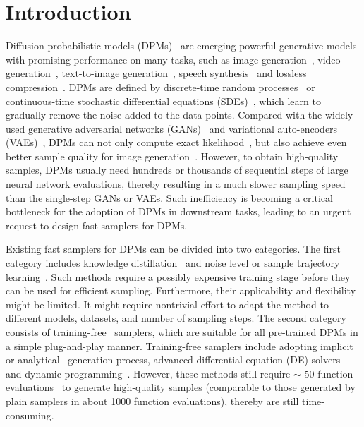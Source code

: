 \section{Introduction}
Diffusion probabilistic models (DPMs)~\citep{sohl2015deep,ho2020denoising,song2020score} are emerging powerful generative models with promising performance on many tasks, such as image generation~\citep{dhariwal2021diffusion,meng2021sdedit}, video generation~\citep{ho2022video}, text-to-image generation~\citep{ramesh2022hierarchical}, speech synthesis~\citep{chen2020wavegrad,chen2021wavegrad} and lossless compression~\citep{kingma2021variational}.
DPMs are defined by discrete-time random processes~\citep{sohl2015deep,ho2020denoising} or continuous-time stochastic differential equations (SDEs)~\citep{song2020score}, which learn to gradually remove the noise added to the data points.
Compared with the widely-used generative adversarial networks (GANs)~\citep{goodfellow2014generative} and variational auto-encoders (VAEs)~\citep{kingma2013auto}, DPMs can not only compute exact likelihood~\citep{song2020score}, but also achieve even better sample quality for image generation~\citep{dhariwal2021diffusion}. 
However, to obtain high-quality samples, DPMs usually need hundreds or thousands of sequential steps of large neural network evaluations, thereby resulting in a much slower sampling speed than the single-step GANs or VAEs. Such inefficiency is becoming a critical bottleneck for the adoption of DPMs in downstream tasks, leading to an urgent request to design fast samplers for DPMs.




Existing fast samplers for DPMs can be divided into two categories.
The first category includes knowledge distillation~\citep{salimans2022progressive,luhman2021knowledge} and noise level or sample trajectory learning~\citep{san2021noise,nichol2021improved,lam2021bilateral,watson2021learning}. Such methods require a possibly expensive training stage before they can be used for efficient sampling. Furthermore, their applicability and flexibility might be limited. It might require nontrivial effort to adapt the method to different models, datasets, and number of sampling steps. 
The second category consists of training-free~\citep{song2020denoising,jolicoeur2021gotta,bao2022analytic} samplers, which are suitable for all pre-trained DPMs in a simple plug-and-play manner. 
Training-free samplers include adopting implicit~\citep{song2020denoising} or analytical~\citep{bao2022analytic} generation process, advanced differential equation (DE) solvers~\citep{song2020score,jolicoeur2021gotta,liu2022pseudo,popov2021diffusion,tachibana2021taylor} and dynamic programming~\citep{watson2021learning}.
However, these methods still require $\sim$ 50 function evaluations~\citep{bao2022analytic} to generate high-quality samples (comparable to those generated by plain samplers in about 1000 function evaluations), thereby are still time-consuming. 













